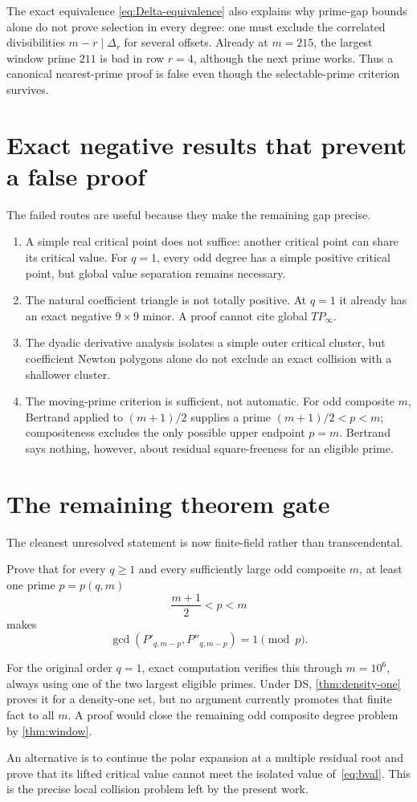 The exact equivalence \eqref{eq:Delta-equivalence} also explains why
prime-gap bounds alone do not prove selection in every degree: one must
exclude the correlated divisibilities $m-r\mid\Delta_r$ for several
offsets. Already at $m=215$, the largest window prime $211$ is bad in row
$r=4$, although the next prime works. Thus a canonical nearest-prime proof
is false even though the selectable-prime criterion survives.

\section{Exact negative results that prevent a false proof}

The failed routes are useful because they make the remaining gap precise.
\begin{enumerate}
\item A simple real critical point does not suffice: another critical point
can share its critical value. For $q=1$, every odd degree has a simple
positive critical point, but global value separation remains necessary.
\item The natural coefficient triangle is not totally positive. At $q=1$
it already has an exact negative $9\times9$ minor. A proof cannot cite global
$TP_\infty$.
\item The dyadic derivative analysis isolates a simple outer critical
cluster, but coefficient Newton polygons alone do not exclude an exact
collision with a shallower cluster.
\item The moving-prime criterion is sufficient, not automatic. For odd
composite $m$, Bertrand applied to $(m+1)/2$ supplies a prime
$(m+1)/2<p<m$; compositeness excludes the only possible upper endpoint
$p=m$. Bertrand says nothing, however, about residual square-freeness for
an eligible prime.
\end{enumerate}

\section{The remaining theorem gate}

The cleanest unresolved statement is now finite-field rather than
transcendental.

\begin{problem}[\OPEN]
Prove that for every $q\ge1$ and every sufficiently large odd composite $m$,
at least one prime $p=p(q,m)$
\[
\frac{m+1}{2}<p<m
\]
makes
\[
\gcd(P'_{q,m-p},P''_{q,m-p})=1\pmod p.
\]
\end{problem}

For the original order $q=1$, exact computation verifies this through
$m=10^6$, always using one of the two largest eligible primes. Under DS,
\cref{thm:density-one} proves it for a density-one set, but no argument
currently promotes that finite fact to all $m$. A proof would close the
remaining odd composite degree problem by \cref{thm:window}.

An alternative is to continue the polar expansion at a multiple residual
root and prove that its lifted critical value cannot meet the isolated value
of~\eqref{eq:bval}. This is the precise local collision problem left by the
present work.
